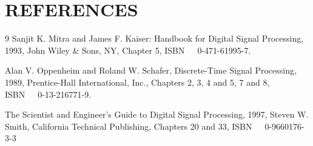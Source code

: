 \documentclass{sebase}
\begin{document}
\section{REFERENCES}

\begin{thebibliography}{9}
 Sanjit K. Mitra and James F. Kaiser: Handbook for Digital
Signal Processing, 1993, John Wiley \& Sons, NY, Chapter 5, ISBN\ \ \
0-471-61995-7.

 Alan V. Oppenheim and Roland W. Schafer, Discrete-Time
Signal Processing, 1989, Prentice-Hall International, Inc., Chapters 2, 3, 4
and 5, 7 and 8, ISBN\ \ \ 0-13-216771-9.

 The Scientist and Engineer's Guide to Digital Signal
Processing, 1997, Steven W. Smith, California Technical Publishing, Chapters
20 and 33, ISBN\ \ \ 0-9660176-3-3

\clearpage%
\end{thebibliography}
\end{document}
